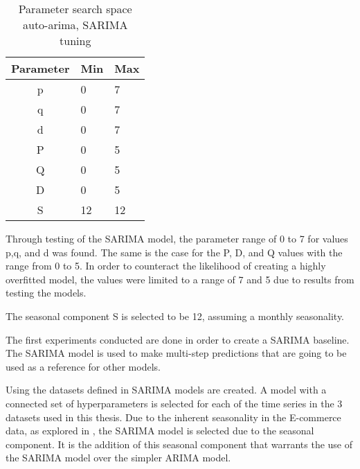 \begin{table}[h]
  \centering
  \caption{Parameter search space auto-arima, SARIMA tuning}
  \label{table:method:arima-tuning}
  \begin{tabular}{|c|l|l|}\hline
    Parameter & Min & Max \\ \hline
    p         & 0   & 7   \\ \hline
    q         & 0   & 7   \\ \hline
    d         & 0   & 7   \\ \hline
    P         & 0   & 5   \\ \hline
    Q         & 0   & 5   \\ \hline
    D         & 0   & 5   \\ \hline
    S         & 12  & 12  \\ \hline
  \end{tabular}
\end{table}


Through testing of the SARIMA model, the parameter range of 0 to 7 for values p,q, and d was found.
The same is the case for the P, D, and Q values with the range from 0 to 5.
In order to counteract the likelihood of creating a highly overfitted model,
the values were limited to a range of 7 and 5 due to results from testing the models.

The seasonal component S is selected to be 12, assuming a monthly seasonality.




\iffalse



  The first experiments conducted are done in order to create a SARIMA baseline.
  The SARIMA model is used to make multi-step predictions that are going to be used as a reference for other models.

  Using the datasets defined in  SARIMA models are created.
  A model with a connected set of hyperparameters is selected for each of the time series in the 3 datasets used in this thesis.
  Due to the inherent seasonality in the E-commerce data, as explored in ,
  the SARIMA model is selected due to the seasonal component.
  It is the addition of this seasonal component that warrants the use of the SARIMA model over the simpler ARIMA model.

